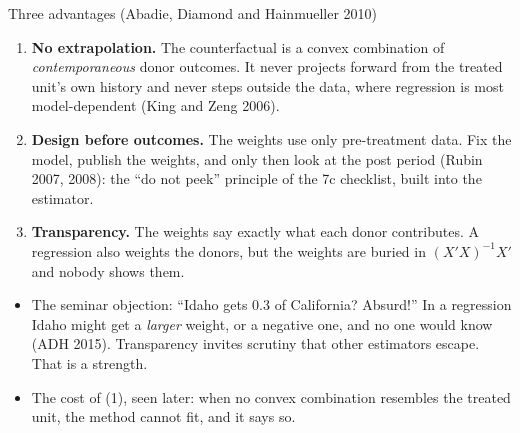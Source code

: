 \documentclass[
  11pt,
  ignorenonframetext,
  aspectratio=169,
]{beamer}
\providecommand{\tightlist}{%
  \setlength{\itemsep}{0pt}\setlength{\parskip}{0pt}}
\begin{document}
\begin{frame}{Three advantages (Abadie, Diamond and Hainmueller 2010)}
\protect{}\label{three-advantages-abadie-diamond-and-hainmueller-2010}
\begin{enumerate}
\tightlist
\item
  \textbf{No extrapolation.} The counterfactual is a convex combination
  of \emph{contemporaneous} donor outcomes. It never projects forward
  from the treated unit's own history and never steps outside the data,
  where regression is most model-dependent (King and Zeng 2006).
\item
  \textbf{Design before outcomes.} The weights use only pre-treatment
  data. Fix the model, publish the weights, and only then look at the
  post period (Rubin 2007, 2008): the ``do not peek'' principle of the
  7c checklist, built into the estimator.
\item
  \textbf{Transparency.} The weights say exactly what each donor
  contributes. A regression also weights the donors, but the weights are
  buried in \((X'X)^{-1}X'\) and nobody shows them.
\end{enumerate}

\vspace{0.4em}

\begin{itemize}
\tightlist
\item
  The seminar objection: ``Idaho gets 0.3 of California? Absurd!'' In a
  regression Idaho might get a \emph{larger} weight, or a negative one,
  and no one would know (ADH 2015). Transparency invites scrutiny that
  other estimators escape. That is a strength.
\item
  The cost of (1), seen later: when no convex combination resembles the
  treated unit, the method cannot fit, and it says so.
\end{itemize}
\end{frame}
\end{document}
